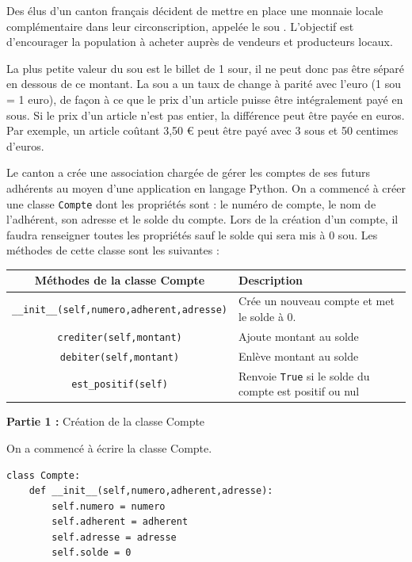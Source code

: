 \documentclass[11pt,a4paper]{article}
\begin{document}
\separateur




Des élus d'un canton français décident de mettre en place une monnaie locale complémentaire dans leur circonscription, appelée le \og{} sou \fg{}. L'objectif est d'encourager la population à acheter auprès de vendeurs et producteurs locaux.

\medskip
La plus petite valeur du sou est le billet de 1 sour, il ne peut donc pas être séparé en dessous de ce montant. La sou a un taux de change à parité avec l'euro (1 sou = 1 euro), de façon à ce que le prix d'un article puisse être intégralement payé en sous. Si le prix d'un article n'est pas entier, la différence peut être payée en euros. Par exemple, un article coûtant 3,50 \euro{} peut être payé avec 3 sous et 50 centimes d'euros.

\medskip
Le canton a crée une association chargée de gérer les comptes de ses futurs adhérents au moyen d'une application en langage Python. On a commencé à créer une classe {\tt Compte} dont les propriétés sont : le numéro de compte, le nom de l'adhérent, son adresse et le solde du compte. Lors de la création d'un compte, il faudra renseigner toutes les propriétés sauf le solde qui sera mis à 0 sou. Les méthodes de cette classe sont les suivantes :

\medskip
\begin{tabularx}{\textwidth}{|c|Y|}
    \hline
    Méthodes de la classe Compte & Description \\
    \hline
    {\tt \_\_init\_\_(self,numero,adherent,adresse)} & Crée un nouveau compte et met le solde à 0. \\
    \hline
    {\tt crediter(self,montant)} & Ajoute montant au solde \\
    \hline
    {\tt debiter(self,montant)} & Enlève montant au solde \\
    \hline
    {\tt est\_positif(self)} & Renvoie {\tt True} si le solde du compte est positif ou nul \\
    \hline
\end{tabularx}

\medskip
\textbf{Partie 1 :} Création de la classe Compte

On a commencé à écrire la classe Compte.
\begin{lstlisting}
class Compte:
    def __init__(self,numero,adherent,adresse):
        self.numero = numero
        self.adherent = adherent
        self.adresse = adresse
        self.solde = 0
\end{lstlisting}
\end{document}
